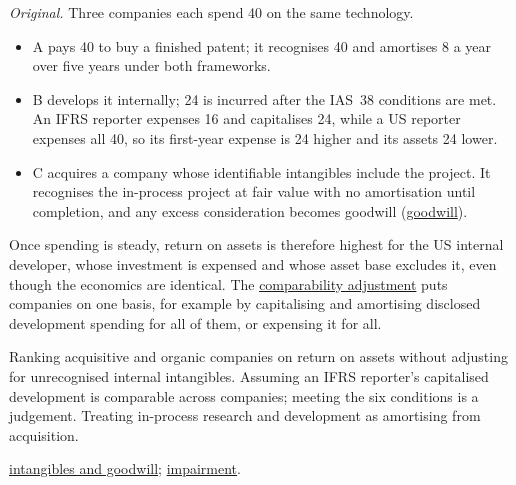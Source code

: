 \begin{qfmethod}
 \emph{Original.} Three companies each spend 40 on the same technology.
\begin{itemize}
\item A pays 40 to buy a finished patent; it recognises 40 and amortises 8 a year over five years under both frameworks.
\item B develops it internally; 24 is incurred after the IAS~38 conditions are met. An IFRS reporter expenses 16 and capitalises 24, while a US reporter expenses all 40, so its first-year expense is 24 higher and its assets 24 lower.
\item C acquires a company whose identifiable intangibles include the project. It recognises the in-process project at fair value with no amortisation until completion, and any excess consideration becomes goodwill (\hyperref[meth:intangibles-goodwill-reporting]{goodwill}).
\end{itemize}
Once spending is steady, return on assets is therefore highest for the US internal developer, whose investment is expensed and whose asset base excludes it, even though the economics are identical. The \hyperref[meth:accounting-analysis-adjustments]{comparability adjustment} puts companies on one basis, for example by capitalising and amortising disclosed development spending for all of them, or expensing it for all.

 Ranking acquisitive and organic companies on return on assets without adjusting for unrecognised internal intangibles. Assuming an IFRS reporter's capitalised development is comparable across companies; meeting the six conditions is a judgement. Treating in-process research and development as amortising from acquisition.

 \hyperref[meth:intangibles-goodwill-reporting]{intangibles and goodwill}; \hyperref[meth:impairment-derecognition]{impairment}.

\end{qfmethod}

